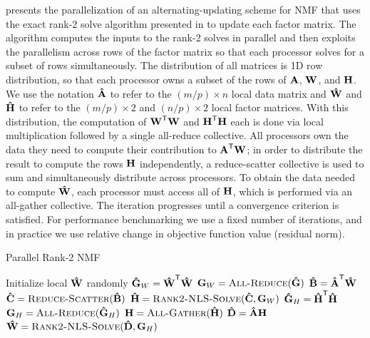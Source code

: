 \documentclass[conference,compsoc]{IEEEtran}
\begin{document}
 presents the parallelization of an alternating-updating scheme for NMF that uses the exact rank-2 solve algorithm presented in  to update each factor matrix.
The algorithm computes the inputs to the rank-2 solves in parallel and then exploits the parallelism across rows of the factor matrix so that each processor solves for a subset of rows simultaneously.
The distribution of all matrices is 1D row distribution, so that each processor owns a subset of the rows of $\M{A}$, $\M{W}$, and $\M{H}$.
We use the notation $\M[\hat]{A}$ to refer to the $(m/p) \times n$ local data matrix and $\M[\hat]{W}$ and $\M[\hat]{H}$ to refer to the $(m/p) \times 2$ and $(n/p)\times 2$ local factor matrices.
With this distribution, the computation of $\M{W}^\Tra\M{W}$ and $\M{H}^\Tra\M{H}$ each is done via local multiplication followed by a single all-reduce collective.
All processors own the data they need to compute their contribution to $\M{A}^\Tra \M{W}$; in order to distribute the result to compute the rows $\M{H}$ independently, a reduce-scatter collective is used to sum and simultaneously distribute across processors.
To obtain the data needed to compute $\M[\hat]{W}$, each processor must access all of $\M{H}$, which is performed via an all-gather collective.
The iteration progresses until a convergence criterion is satisfied.
For performance benchmarking we use a fixed number of iterations, and in practice we use relative change in objective function value (residual norm).

\begin{algorithm}
\caption{Parallel Rank-2 NMF}
\label{alg:parrank2nmf}
\begin{algorithmic}[1]
		\State Initialize local $\M[\hat]{W}$ randomly
			\State {}
			\State $\M[\hat]{G}_W = \M[\hat]{W}^\Tra \M[\hat]{W}$
			\State $\M{G}_W = \textsc{All-Reduce}(\M[\hat]{G})$
			\State $\M[\hat]{B} = \M[\hat]{A}^\Tra \M[\hat]{W}$ %
			\State $\M[\hat]{C} = \textsc{Reduce-Scatter}(\M[\hat]{B})$
			\State $\M[\hat]{H} = \textsc{Rank2-NLS-Solve}(\M[\hat]{C},\M{G}_W)$
			\State {}
			\State $\M[\hat]{G}_H = \M[\hat]{H}^\Tra \M[\hat]{H}$
			\State $\M{G}_H = \textsc{All-Reduce}(\M[\hat]{G}_H)$
			\State $\M{H} = \textsc{All-Gather}(\M[\hat]{H})$
			\State $\M[\hat]{D} = \M[\hat]{A} \M{H}$ %
			\State $\M[\hat]{W} = \textsc{Rank2-NLS-Solve}(\M[\hat]{D},\M{G}_H)$
		\EndWhile
	\EndFunction
\end{algorithmic}
\end{algorithm}
\end{document}
